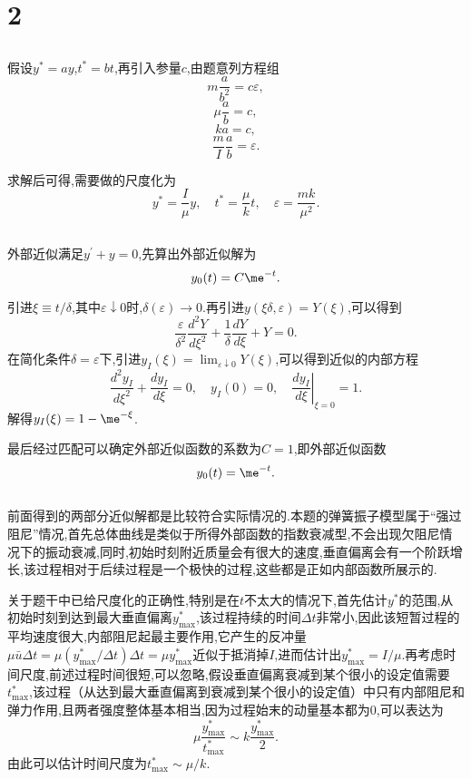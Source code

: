 \documentclass[12pt]{article}
\begin{document}
\section{2}

\subsection{}

假设$y^{*}=a y$,$t^{*}=b t$,再引入参量$c$,由题意列方程组
$$m \frac{a}{b^{2}}=c \varepsilon,$$
$$\mu \frac{a}{b}=c,$$
$$k a=c,$$
$$\frac{m}{I} \frac{a}{b}=\varepsilon.$$

求解后可得,需要做的尺度化为
$$
y^{*}=\frac{I}{\mu} y, \quad t^{*}=\frac{\mu}{k} t, \quad \varepsilon=\frac{m k}{\mu^{2}}.
$$
\subsection{}
外部近似满足$y^{\prime}+y=0$,先算出外部近似解为
$$
y_{0}(t)=C \me^{-t}.
$$

引进$\xi \equiv t / \delta$,其中$\varepsilon \downarrow 0$时,$\delta(\varepsilon) \rightarrow 0$.再引进$y(\xi \delta, \varepsilon)=Y(\xi)$,可以得到
$$
\frac{\varepsilon}{\delta^{2}} \frac{d^{2} Y}{d \xi^{2}}+\frac{1}{\delta} \frac{d Y}{d \xi}+Y=0.
$$
在简化条件$\delta=\varepsilon$下,引进$y_{I}(\xi)=\lim _{\varepsilon \downarrow 0} Y(\xi)$,可以得到近似的内部方程
$$
\frac{d^{2} y_{I}}{d \xi^{2}}+\frac{d y_{I}}{d \xi}=0, \quad y_{I}(0)=0,\left.\quad \frac{d y_{I}}{d \xi}\right|_{\xi=0}=1.
$$
解得$y_{I}(\xi)=1-\me^{-\xi}$.

最后经过匹配可以确定外部近似函数的系数为$C=1$,即外部近似函数
$$
y_{0}(t)=\me^{-t}.
$$

\subsection{}
前面得到的两部分近似解都是比较符合实际情况的.本题的弹簧振子模型属于“强过阻尼”情况,首先总体曲线是类似于所得外部函数的指数衰减型,不会出现欠阻尼情况下的振动衰减,同时,初始时刻附近质量会有很大的速度,垂直偏离会有一个阶跃增长,该过程相对于后续过程是一个极快的过程,这些都是正如内部函数所展示的.

关于题干中已给尺度化的正确性,特别是在$t$不太大的情况下,首先估计$y^*$的范围,从初始时刻到达到最大垂直偏离$y_{\max }^{*}$,该过程持续的时间$\Delta t$非常小,因此该短暂过程的平均速度很大,内部阻尼起最主要作用,它产生的反冲量$\mu \bar{u} \Delta t=\mu\left(y_{\max }^{*} / \Delta t\right) \Delta t=\mu y_{\max }^{*}$近似于抵消掉$I$,进而估计出$y_{\max }^{*}=I / \mu$.再考虑时间尺度,前述过程时间很短,可以忽略,假设垂直偏离衰减到某个很小的设定值需要$t_{\max }^{*}$,该过程（从达到最大垂直偏离到衰减到某个很小的设定值）中只有内部阻尼和弹力作用,且两者强度整体基本相当,因为过程始末的动量基本都为0,可以表达为
$$
\mu \frac{y_{\max }^{*}}{t_{\max }^{*}} \sim k \frac{y_{\max }^{*}}{2}.
$$
由此可以估计时间尺度为$t_{\max }^{*} \sim \mu / k$.
\end{document}
